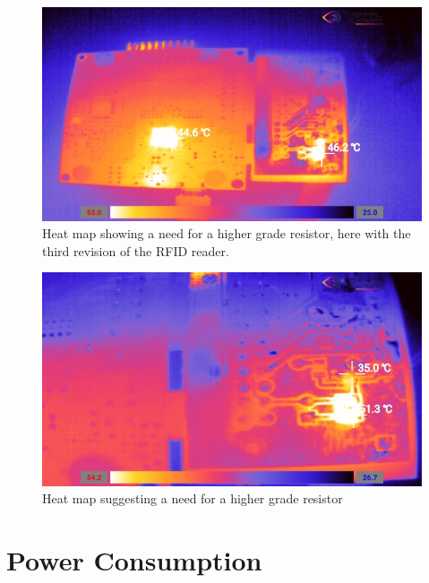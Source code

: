 \begin{figure}
    \centering
    \includegraphics[width=\textwidth]{06_My_Testing_Results/figures/Heat_analysis/Heatmap_with_Xpro.jpg}
    \caption{Heat map showing a need for a higher grade resistor, here with the third revision of the RFID reader.}
    \label{fig:06:Heatmap1}
\end{figure}
\begin{figure}
    \centering
    \includegraphics[width=\textwidth]{06_My_Testing_Results/figures/Heat_analysis/Heatmap_RFIDv3.jpg}
    \caption{Heat map suggesting a need for a higher grade resistor}
    \label{fig:06:Heatmap2}
\end{figure}

\section{Power Consumption}
